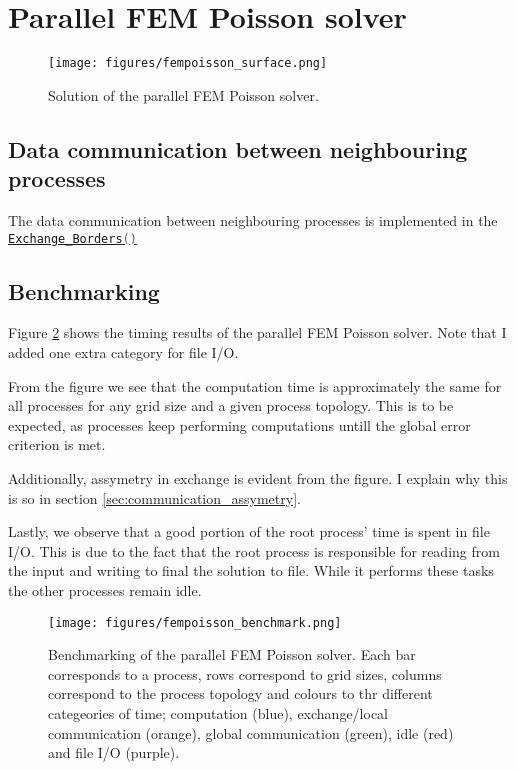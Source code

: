 \section{Parallel FEM Poisson solver}
\begin{figure}[H]
    \centering
    \texttt{[image: figures/fempoisson\_surface.png]}
    \caption{Solution of the parallel FEM Poisson solver.}
    \label{fig:parallel_fem}
\end{figure}

\subsection{Data communication between neighbouring processes}
The data communication between neighbouring processes is implemented in the
\href{https://github.com/PhilipSoliman/hpc-labs/blob/96864119216b357345f2e0b75c3b423d411a9a99/assignment_2/MPI_Fempois.c#L517-L530}
{\lstinline[language=C]|Exchange_Borders()|}

\subsection{Benchmarking}
Figure \ref{fig:parallel_fem_benchmark} shows the timing results of the parallel FEM Poisson solver.
Note that I added one extra category for file I/O.

From the figure we see that the computation time is approximately the same for all processes for any grid size
and a given process topology. This is to be expected, as processes keep performing computations untill the global 
error criterion is met.

Additionally, assymetry in exchange is evident from the figure. I explain why this is so in 
section \ref{sec:communication_assymetry}. 

Lastly, we observe that a good portion of the root process' time is spent in file I/O. This is due 
to the fact that the root process is responsible for reading from the input and writing to final the solution to file. 
While it performs these tasks the other processes remain idle.

\begin{figure}[H]
    \centering
    \texttt{[image: figures/fempoisson\_benchmark.png]}
    \caption{Benchmarking of the parallel FEM Poisson solver. Each bar corresponds
    to a process, rows correspond to grid sizes, columns correspond to the process topology
    and colours to thr different categeories of time; computation (blue),
    exchange/local communication (orange), global communication (green), 
    idle (red) and file I/O (purple).}
    \label{fig:parallel_fem_benchmark}
\end{figure}


